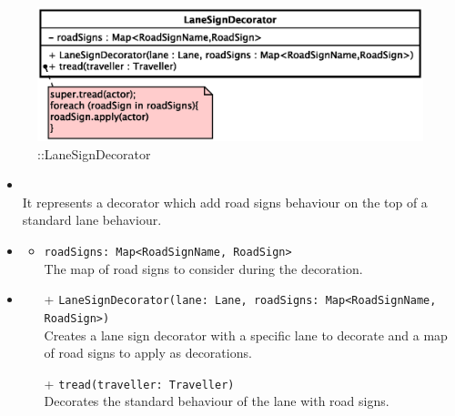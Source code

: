 \begin{figure}[h]
\centering
\includegraphics[scale=0.6,keepaspectratio]{images/solution/app/backend/lane_sign_decorator.eps}
\caption{\pReactiveComponentLaneDecoration::LaneSignDecorator}
\label{fig:sd-app-lane_sign_decorator}
\end{figure}
\FloatBarrier
\begin{itemize}
  \item \textbf{\descr} \\
    It represents a decorator which add road signs behaviour on the top of a standard lane behaviour. 
  \item \textbf{\attrs}
  \begin{itemize}
    \item \texttt{roadSigns: Map<RoadSignName, RoadSign>} \\
The map of road signs to consider during the decoration.
  \end{itemize}
  \item \textbf{\ops}
   \begin{itemize} 
   \item[+] \texttt{LaneSignDecorator(lane: Lane, roadSigns: Map<RoadSignName, RoadSign>)} \\
Creates a lane sign decorator with a specific lane to decorate and a map of road signs to apply as decorations.
    \item[+] \texttt{tread(traveller: Traveller)} \\
Decorates the standard behaviour of the lane with road signs.  
  \end{itemize}
\end{itemize}
